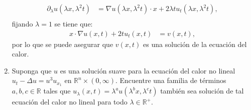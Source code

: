 \begin{homeworkProblem}
\begin{solucion}
\begin{enumerate}
        \begin{align*}
          \partial_{\lambda}u(\lambda x,\lambda^2 t)&=\nabla u (\lambda x,\lambda^2 t)\cdot x+2\lambda tu_{t}(\lambda x,\lambda^2 t),\\
        \end{align*}
        fijando $\lambda=1$ se tiene que:
        \begin{align*}
          x\cdot \nabla u(x,t)+2tu_t(x,t)&=v(x,t),
        \end{align*}
        por lo que se puede asegurar que $v(x,t)$ es una solución de la ecuación del calor.
        \demostrado
        \item Suponga que $u$ es una solución suave para la ecuación del calor no lineal $u_t-\Delta u=u^3u_{x_1}$ en $\mathbb{R}^{n}\times (0,\infty)$. Encuentre una familia de términos $a,b,c\in\mathbb{R}$ tales que $u_\lambda(x,t)=\lambda^au(\lambda^bx,\lambda^ct)$ también sea solución de tal ecuación del calor no lineal para todo $\lambda\in\mathbb{R}^{+}$.\\ 
    \end{enumerate}
    \demostrado
  \end{solucion}  
\end{homeworkProblem}
